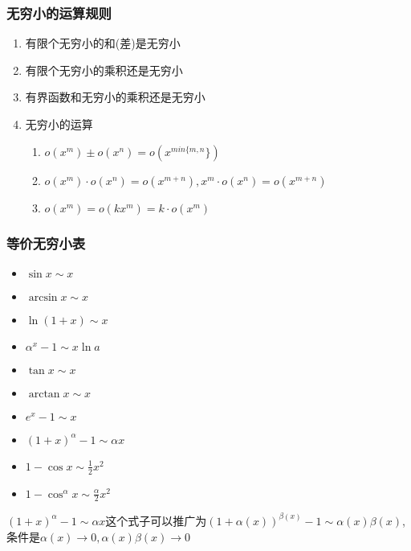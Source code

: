 \subsubsection{无穷小的运算规则}
\begin{enumerate}
    \item 有限个无穷小的和(差)是无穷小
    \item 有限个无穷小的乘积还是无穷小
    \item 有界函数和无穷小的乘积还是无穷小
    \item 无穷小的运算 \par
          \begin{enumerate}
              \item $ o(x^{m})\pm o(x^{n})=o(x^{min\{m,n}\}) $
              \item $ o(x^{m})\cdot o(x^{n})=o(x^{m+n}), x^{m}\cdot o(x^{n})=o(x^{m+n}) $
              \item $ o(x^{m})=o(kx^{m})=k\cdot o(x^{m}) $
          \end{enumerate}
\end{enumerate}
\subsubsection{等价无穷小表}
\begin{multicols}{2}
    \begin{itemize}
        \item $ \sin x\sim x $
        \item $ \arcsin x\sim x $
        \item $ \ln (1+x)\sim x $
        \item $ \alpha^{x}-1\sim x\ln a $
        \item $ \tan x\sim x $
        \item $ \arctan x\sim x $
        \item $ e^{x}-1\sim x $
        \item $ (1+x)^{\alpha}-1\sim \alpha x $
        \item $ 1-\cos x\sim \frac{1}{2}x^{2} $
        \item $ 1-\cos^{\alpha} x\sim \frac{\alpha}{2}x^{2} $
    \end{itemize}
\end{multicols}
\begin{tcolorbox}
    $ (1+x)^{\alpha}-1\sim \alpha x $这个式子可以推广为$ (1+\alpha(x))^{\beta(x)}-1\sim \alpha (x)\beta (x) $, 条件是$ \alpha(x)\rightarrow 0, \alpha(x)\beta(x)\rightarrow 0 $
\end{tcolorbox}

